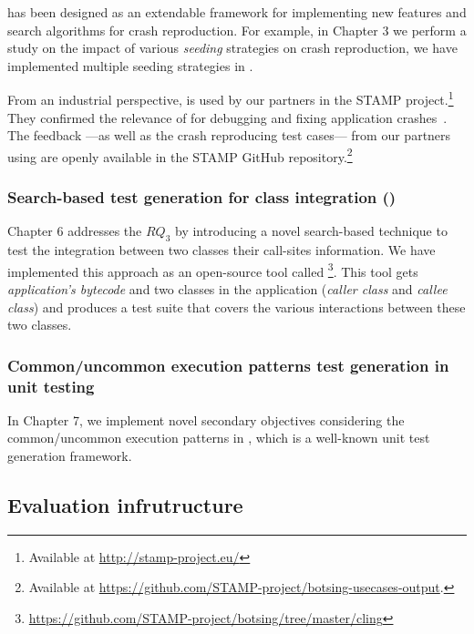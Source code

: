 \botsing has been designed as an extendable framework for implementing new features and search algorithms for crash reproduction. For example, in Chapter 3 we perform a study on the impact of various \emph{seeding} strategies on crash reproduction, we have implemented multiple seeding strategies in \botsing.

From an industrial perspective, \botsing is used by our partners in the STAMP project.\footnote{Available at \url{http://stamp-project.eu/}}
They confirmed the relevance of \botsing for debugging and fixing application crashes~\cite{D57}.
The feedback ---as well as the crash reproducing test cases--- from our partners using \botsing are openly available in the STAMP GitHub repository.\footnote{Available at \url{https://github.com/STAMP-project/botsing-usecases-output}.}

\subsubsection{Search-based test generation for class integration (\cling)}
Chapter 6 addresses the $RQ_3$ by introducing a novel search-based technique to test the integration between two classes their call-sites information. We have implemented this approach as an open-source tool called \cling\footnote{\url{https://github.com/STAMP-project/botsing/tree/master/cling}}. This tool gets \emph{application's bytecode} and two classes in the application (\emph{caller class} and \emph{callee class}) and produces a test suite that covers the various interactions between these two classes.

\subsubsection{Common/uncommon execution patterns test generation in unit testing}
In Chapter 7, we implement novel secondary objectives considering the common/uncommon execution patterns in \evosuite, which is a well-known unit test generation framework.

\subsection{Evaluation infrutructure}

